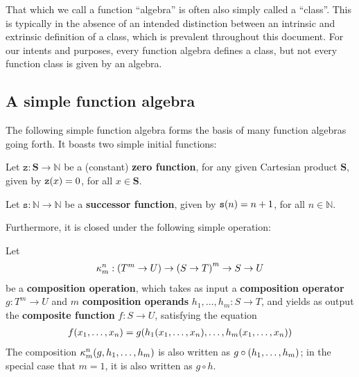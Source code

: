 \begin{remark} That which we call a function ``algebra'' is often also simply
called a ``class''. This is typically in the absence of an intended distinction
between an intrinsic and extrinsic definition of a class, which is prevalent
throughout this document. For our intents and purposes, every function algebra
defines a class, but not every function class is given by an algebra.
\end{remark} 

\subsection{A simple function algebra}

The following simple function algebra forms the basis of many function algebras
going forth. It boasts two simple initial functions:

\begin{definition} \label{def:zero-function} Let $\mathtt{z} : \mathbf{S}
\rightarrow \mathbb{N}$ be a (constant) \textbf{zero function}, for any given
Cartesian product $\mathbf{S}$, given by $\mathtt{z}{\mathopen{}\left({x}\right)\mathclose{}} = 0$, for all $x \in
\mathbf{S}$.   \end{definition}

\begin{definition} \label{def:successor-function} Let $\mathtt{s} : \mathbb{N}
\rightarrow \mathbb{N}$ be a \textbf{successor function}, given by
$\mathtt{s}{\mathopen{}\left({n}\right)\mathclose{}} = n + 1$, for all $n \in \mathbb{N}$.  \end{definition}

Furthermore, it is closed under the following simple operation:

\begin{definition} \label{def:composition-operation} Let\begin{align*}
%
\kappa^n_m : \p{T^m \rightarrow U} \rightarrow \p{S \rightarrow T}^m
\rightarrow S \rightarrow U
%
\end{align*}be a \textbf{composition operation}, which takes as input a
\textbf{composition operator} $g : T^m \rightarrow U$ and $m$
\textbf{composition operands} $h_1, \ldots, h_m : S \rightarrow T$, and yields
as output the \textbf{composite function} $f : S \rightarrow U$, satisfying the
equation\begin{align*}
%
f\p{x_1,\ldots,x_n} = g\p{h_1\p{x_1,\ldots,x_n}, \ldots, h_m\p{x_1,
\ldots,x_n}}
%
\end{align*} The composition $\kappa^n_m{\mathopen{}\left({g,h_1, \ldots, h_m}\right)\mathclose{}}$ is also written
as $g \circ {\ensuremath{\mathopen{}\left({h_1, \ldots, h_m}\right)\mathclose{}}}$; in the special case that $m=1$, it is also
written as $g \circ h$.\end{definition}

